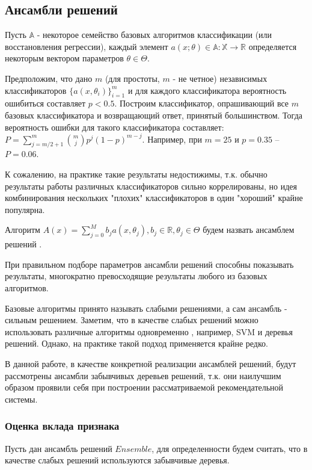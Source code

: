 \documentclass[12pt,a4paper]{report}
\begin{document}
\subsection{Ансамбли решений}
Пусть $\mathbb{A}$ - некоторое семейство базовых алгоритмов классификации (или восстановления регрессии), каждый элемент $a(x; \theta) \in \mathbb{A} : \mathbb{X} \to \mathbb{R}$ определяется некоторым вектором параметров $\theta \in \Theta$.

Предположим, что дано $m$ (для простоты, $m$ - не четное) независимых классификаторов $\{a(x, \theta_i)\}_{i=1}^m$ и для каждого классификатора вероятность ошибиться составляет $p < 0.5$.	Построим классификатор, опрашивающий все $m$ базовых классификатора и возвращающий ответ, принятый большинством. Тогда вероятность ошибки для такого классификатора составляет: $P = \sum_{j = m/2 + 1}^m \binom{m}{j}p^{j}(1-p)^{m-j}$. Например, при $m=25$ и $p=0.35$ -- $P=0.06$.

К сожалению, на практике такие результаты недостижимы, т.к. обычно результаты работы различных классификаторов сильно коррелированы, но идея комбинирования нескольких "плохих" классификаторов в один "хороший" крайне популярна.

\begin{Def}
Алгоритм $A(x) = \sum_{j=0}^{M}b_ja(x,\theta_j), b_j \in \mathbb{R}, \theta_j \in \Theta$ будем назвать ансамблем решений \cite{En}.
\end{Def}
При правильном подборе параметров ансамбли решений способны показывать результаты, многократно превосходящие результаты любого из базовых алгоритмов.


Базовые алгоритмы принято называть $\textit{слабыми решениями}$, а сам ансамбль - $\textit{сильным решением}$.
Заметим, что в качестве слабых решений можно использовать различные алгоритмы одновременно , например, SVM и деревья решений. Однако, на практике такой подход применяется крайне редко.

В данной работе, в качестве конкретной реализации ансамблей решений, будут рассмотрены ансамбли забывчивых деревьев решений, т.к. они наилучшим образом проявили себя при построении рассматриваемой рекомендательной системы.

\subsubsection{Оценка вклада признака}
Пусть дан ансамбль решений $Ensemble$, для определенности будем считать, что в качестве слабых решений используются забывчивые деревья.
\end{document}
